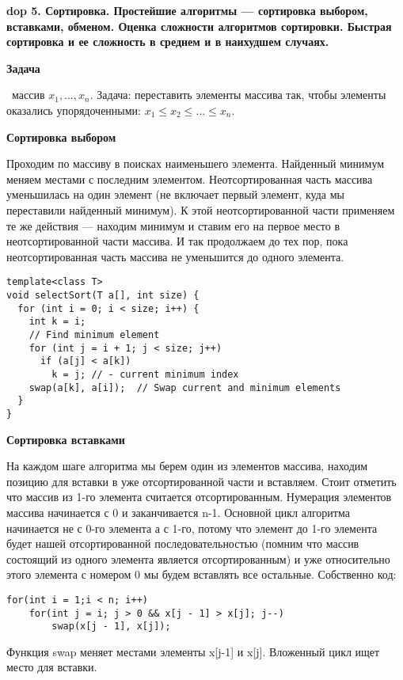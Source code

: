 \textbf{\LARGE dop 5. Сортировка.  Простейшие  алгоритмы --- сортировка  выбором,  вставками,  обменом.  Оценка  сложности алгоритмов сортировки. Быстрая сортировка и ее сложность в среднем и в наихудшем случаях.}

\textbf{Задача}

\faEye \ массив $x_1, \dots, x_n$.
Задача: переставить элементы массива так, чтобы элементы оказались упорядоченными: $x_1 \leqslant x_2 \leqslant \dots \leqslant x_n$.

\textbf{Сортировка выбором}

Проходим по массиву в поисках наименьшего элемента. Найденный минимум меняем местами с последним элементом. Неотсортированная часть массива уменьшилась на один элемент (не включает первый элемент, куда мы переставили найденный минимум). К этой неотсортированной части применяем те же действия — находим минимум и ставим его на первое место в неотсортированной части массива. И так продолжаем до тех пор, пока неотсортированная часть массива не уменьшится до одного элемента.

\begin{verbatim}
template<class T> 
void selectSort(T a[], int size) {
  for (int i = 0; i < size; i++) {
    int k = i;
    // Find minimum element
    for (int j = i + 1; j < size; j++)
      if (a[j] < a[k])
        k = j; // - current minimum index
    swap(a[k], a[i]);  // Swap current and minimum elements
  }
}
\end{verbatim}

\textbf{Сортировка вставками}

На каждом шаге алгоритма мы берем один из элементов массива, находим позицию для вставки в уже отсортированной части и вставляем. Стоит отметить что массив из 1-го элемента считается отсортированным.
Нумерация элементов массива начинается с 0 и заканчивается n-1.
Основной цикл алгоритма начинается не с 0-го элемента а с 1-го, потому что элемент до 1-го элемента будет нашей отсортированной последовательностью (помним что массив состоящий из одного элемента является отсортированным) и уже относительно этого элемента с номером 0 мы будем вставлять все остальные. Собственно код:

\begin{verbatim}
for(int i = 1;i < n; i++)         
    for(int j = i; j > 0 && x[j - 1] > x[j]; j--) 
	    swap(x[j - 1], x[j]);
\end{verbatim}

Функция swap меняет местами элементы x[j-1] и x[j]. Вложенный цикл ищет место для вставки.

